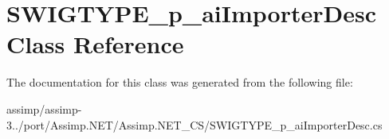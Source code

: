\hypertarget{class_s_w_i_g_t_y_p_e__p__ai_importer_desc}{\section{S\+W\+I\+G\+T\+Y\+P\+E\+\_\+p\+\_\+ai\+Importer\+Desc Class Reference}
\label{class_s_w_i_g_t_y_p_e__p__ai_importer_desc}
}


The documentation for this class was generated from the following file\+:\begin{DoxyCompactItemize}
\item 
assimp/assimp-\/3../port/\+Assimp.\+N\+E\+T/\+Assimp.\+N\+E\+T\+\_\+\+C\+S/S\+W\+I\+G\+T\+Y\+P\+E\+\_\+p\+\_\+ai\+Importer\+Desc.\+cs\end{DoxyCompactItemize}
